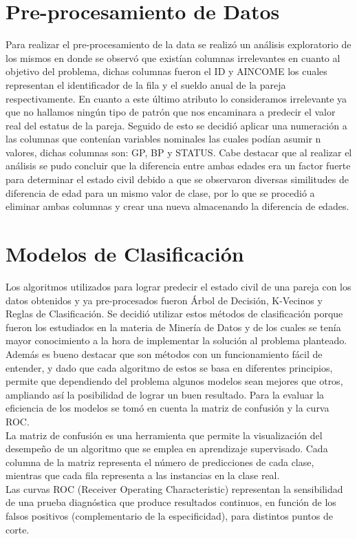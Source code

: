 \documentclass{sciposter}
\begin{document}
\begin{multicols}{3}
\section{Pre-procesamiento de Datos}
Para realizar el pre-procesamiento de la data se realizó un análisis exploratorio de los mismos en donde se observó que existían columnas irrelevantes en cuanto al objetivo del problema, dichas columnas fueron el ID y AINCOME los cuales representan el identificador de la fila y el sueldo anual de la pareja respectivamente. En cuanto a este último atributo lo consideramos irrelevante ya que no hallamos ningún tipo de patrón que nos encaminara a predecir el valor real del estatus de la pareja. Seguido de esto se decidió aplicar una numeración a las columnas que contenían variables nominales las cuales podían asumir n valores, dichas columnas son: GP, BP y STATUS. Cabe destacar que al realizar el análisis se pudo concluir que la diferencia entre ambas edades era un factor fuerte para determinar el estado civil debido a que se observaron diversas similitudes de diferencia de edad para un mismo valor de clase, por lo que se procedió a eliminar ambas columnas y crear una nueva almacenando la diferencia de edades.  
\\

\section{Modelos de Clasificación}
Los algoritmos utilizados para lograr predecir el estado civil de una pareja con los datos obtenidos y ya pre-procesados fueron Árbol de Decisión, K-Vecinos y Reglas de Clasificación. Se decidió utilizar estos métodos de clasificación porque fueron los estudiados en la materia de Minería de Datos y de los cuales se tenía mayor conocimiento a la hora de implementar la solución al problema planteado. Además es bueno destacar que son métodos con un funcionamiento fácil de entender, y dado que cada algoritmo de estos se basa en diferentes principios, permite que dependiendo del problema algunos modelos sean mejores que otros, ampliando así la posibilidad de lograr un buen resultado. Para la evaluar la eficiencia de los modelos se tomó en cuenta la matriz de confusión y la curva ROC.\\
La matriz de confusión\cite{MatrixConfusion} es una herramienta que permite la visualización del desempeño de un algoritmo que se emplea en aprendizaje supervisado. Cada columna de la matriz representa el número de predicciones de cada clase, mientras que cada fila representa a las instancias en la clase real.\\
Las curvas ROC (Receiver Operating Characteristic)\cite{Roc} representan la sensibilidad de una prueba diagnóstica que produce resultados continuos, en función de los falsos positivos (complementario de la especificidad), para distintos puntos de corte.
\\


\end{multicols}
\end{document}
